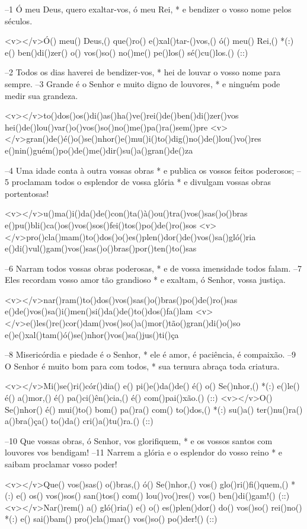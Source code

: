 –1 Ó meu Deus, quero exaltar-vos, ó meu Rei, *
e bendizer o vosso nome pelos séculos.

<v></v>Ó() meu() Deus,() que()ro() e()xal()tar-()vos,() ó() meu() Rei,() *(:)
e() ben()di()zer() o() vos()so() no()me() pe()los() sé()cu()los.() (::)

–2 Todos os dias haverei de bendizer-vos, *
hei de louvar o vosso nome para sempre.
–3 Grande é o Senhor e muito digno de louvores, *
e ninguém pode medir sua grandeza.

<v></v>to()dos()os()di()as()ha()ve()rei()de()ben()di()zer()vos
hei()de()lou()var()o()vos()so()no()me()pa()ra()sem()pre
<v></v>gran()de()é()o()se()nhor()e()mu()i()to()dig()no()de()lou()vo()res
e()nin()guém()po()de()me()dir()su()a()gran()de()za

–4 Uma idade conta à outra vossas obras *
e publica os vossos feitos poderosos;
–5 proclamam todos o esplendor de vossa glória *
e divulgam vossas obras portentosas!

<v></v>u()ma()i()da()de()con()ta()à()ou()tra()vos()sas()o()bras
e()pu()bli()ca()os()vos()sos()fei()tos()po()de()ro()sos
<v></v>pro()cla()mam()to()dos()o()es()plen()dor()de()vos()sa()gló()ria
e()di()vul()gam()vos()sas()o()bras()por()ten()to()sas

–6 Narram todos vossas obras poderosas, *
e de vossa imensidade todos falam.
–7 Eles recordam vosso amor tão grandioso *
e exaltam, ó Senhor, vossa justiça.

<v></v>nar()ram()to()dos()vos()sas()o()bras()po()de()ro()sas
e()de()vos()sa()i()men()si()da()de()to()dos()fa()lam
<v></v>e()les()re()cor()dam()vos()so()a()mor()tão()gran()di()o()so
e()e()xal()tam()ó()se()nhor()vos()sa()jus()ti()ça

–8 Misericórdia e piedade é o Senhor, *
ele é amor, é paciência, é compaixão.
–9 O Senhor é muito bom para com todos, *
sua ternura abraça toda criatura.

<v></v>Mi()se()ri()cór()dia() e() pi()e()da()de() é() o() Se()nhor,() *(:)
e()le() é() a()mor,() é() pa()ci()ên()cia,() é() com()pai()xão.() (::)
<v></v>O() Se()nhor() é() mui()to() bom() pa()ra() com() to()dos,() *(:)
su()a() ter()nu()ra() a()bra()ça() to()da() cri()a()tu()ra.() (::)

–10 Que vossas obras, ó Senhor, vos glorifiquem, *
e os vossos santos com louvores vos bendigam!
–11 Narrem a glória e o esplendor do vosso reino *
e saibam proclamar vosso poder!

<v></v>Que() vos()sas() o()bras,() ó() Se()nhor,() vos() glo()ri()fi()quem,() *(:)
e() os() vos()sos() san()tos() com() lou()vo()res() vos() ben()di()gam!() (::)
<v></v>Nar()rem() a() gló()ria() e() o() es()plen()dor() do() vos()so() rei()no() *(:)
e() sai()bam() pro()cla()mar() vos()so() po()der!() (::)

